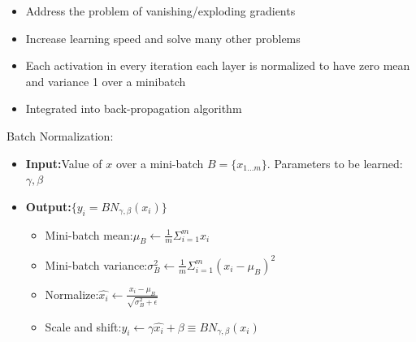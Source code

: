 \begin{itemize}
\item Address the problem of vanishing/exploding gradients
\item Increase learning speed and solve many other problems
\item Each activation in every iteration each layer is normalized to have zero mean and variance 1 over a minibatch
\item Integrated into back-propagation algorithm
\end{itemize}
Batch Normalization:
\begin{itemize}
\item \textbf{Input:}Value of $x$ over a mini-batch $ B = \{ x_{1...m} \} $. Parameters to be learned: $\gamma, \beta$\\
\item \textbf{Output:}$ \{y_i = BN_{\gamma, \beta}(x_i)\}$
\begin{itemize}
\item Mini-batch mean:\hspace{0.2cm}$\mu_B \leftarrow \frac{1}{m}\Sigma^m_{i=1}x_i$\\[0.2cm]
\item Mini-batch variance:\hspace{0.2cm}$\sigma^2_B \leftarrow \frac{1}{m}\Sigma^m_{i=1}(x_i-\mu_B)^2 $\\[0.2cm]
\item Normalize:\hspace{0.2cm}$\hat{x_i} \leftarrow \frac{x_i - \mu_B}{\sqrt{\sigma^2_B + \epsilon}}$\\[0.2cm]
\item Scale and shift:\hspace{0.2cm}$y_i \leftarrow \gamma \hat{x_i} + \beta \equiv BN_{\gamma, \beta}(x_i) $
\end{itemize}
\end{itemize}
